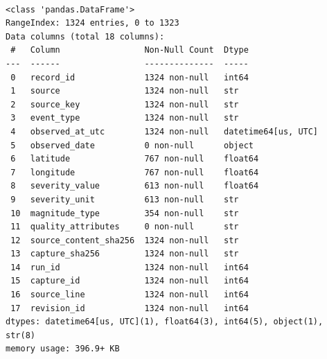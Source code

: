 {\scriptsize\begin{verbatim}

<class 'pandas.DataFrame'>
RangeIndex: 1324 entries, 0 to 1323
Data columns (total 18 columns):
 #   Column                 Non-Null Count  Dtype              
---  ------                 --------------  -----              
 0   record_id              1324 non-null   int64              
 1   source                 1324 non-null   str                
 2   source_key             1324 non-null   str                
 3   event_type             1324 non-null   str                
 4   observed_at_utc        1324 non-null   datetime64[us, UTC]
 5   observed_date          0 non-null      object             
 6   latitude               767 non-null    float64            
 7   longitude              767 non-null    float64            
 8   severity_value         613 non-null    float64            
 9   severity_unit          613 non-null    str                
 10  magnitude_type         354 non-null    str                
 11  quality_attributes     0 non-null      str                
 12  source_content_sha256  1324 non-null   str                
 13  capture_sha256         1324 non-null   str                
 14  run_id                 1324 non-null   int64              
 15  capture_id             1324 non-null   int64              
 16  source_line            1324 non-null   int64              
 17  revision_id            1324 non-null   int64              
dtypes: datetime64[us, UTC](1), float64(3), int64(5), object(1), str(8)
memory usage: 396.9+ KB

\end{verbatim}}
